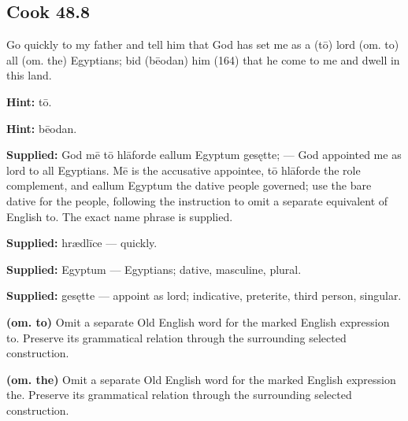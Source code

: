\par\begin{minipage}{\linewidth}\raggedright
\subsection*{Cook 48.8}

Go quickly to my father and tell him that God has set me as a (tō) lord (om. to) all (om. the) Egyptians; bid (bēodan) him (164) that he come to me and dwell in this land.

\textbf{Hint:} tō.

\textbf{Hint:} bēodan.

\end{minipage}\par\addvspace{4pt}

\textbf{Supplied:} God mē tō hlāforde eallum Egyptum gesętte; — God appointed me as lord to all Egyptians. Mē is the accusative appointee, tō hlāforde the role complement, and eallum Egyptum the dative people governed; use the bare dative for the people, following the instruction to omit a separate equivalent of English to. The exact name phrase is supplied.

\textbf{Supplied:} hrædlīce — quickly.

\textbf{Supplied:} Egyptum — Egyptians; dative, masculine, plural.

\textbf{Supplied:} gesętte — appoint as lord; indicative, preterite, third person, singular.

\textbf{(om. to)} Omit a separate Old English word for the marked English expression to. Preserve its grammatical relation through the surrounding selected construction.

\textbf{(om. the)} Omit a separate Old English word for the marked English expression the. Preserve its grammatical relation through the surrounding selected construction.

